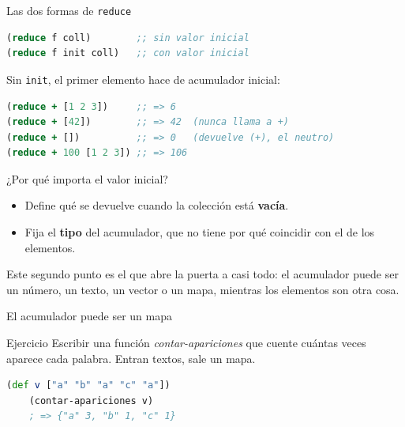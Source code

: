 \documentclass{beamer}
\begin{document}
\begin{frame}[fragile]{Las dos formas de \texttt{reduce}}
    \begin{lstlisting}[language=Clojure]
(reduce f coll)        ;; sin valor inicial
(reduce f init coll)   ;; con valor inicial
    \end{lstlisting}

    \vspace{0.2cm}
    Sin \texttt{init}, el primer elemento hace de acumulador inicial:

    \begin{lstlisting}[language=Clojure]
(reduce + [1 2 3])     ;; => 6
(reduce + [42])        ;; => 42  (nunca llama a +)
(reduce + [])          ;; => 0   (devuelve (+), el neutro)
(reduce + 100 [1 2 3]) ;; => 106
    \end{lstlisting}
\end{frame}

\begin{frame}[fragile]{¿Por qué importa el valor inicial?}
    \begin{itemize}
        \item Define qué se devuelve cuando la colección está \textbf{vacía}.
        \item Fija el \textbf{tipo} del acumulador, que no tiene por qué coincidir con el de los elementos.
    \end{itemize}

    \vspace{0.3cm}
    Este segundo punto es el que abre la puerta a casi todo: el acumulador puede ser un número, un texto, un vector o un mapa, mientras los elementos son otra cosa.
\end{frame}

\begin{frame}[fragile]{El acumulador puede ser un mapa}
    
    \begin{block}{Ejercicio}
    Escribir una función \textit{contar-apariciones} que cuente cuántas veces aparece cada palabra. Entran textos, sale un mapa.
    \end{block}

    \begin{lstlisting}[language=Clojure]
    (def v ["a" "b" "a" "c" "a"])
    (contar-apariciones v)
    ; => {"a" 3, "b" 1, "c" 1}
    \end{lstlisting}

\end{frame}
\end{document}
